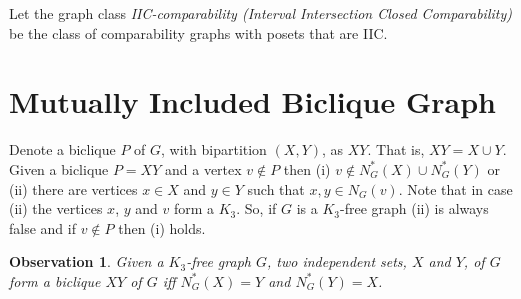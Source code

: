 \documentclass{article}
\newcommand{\margem}[2]
        {\mbox{}\marginpar{%
        \raggedright\textcolor{#2}{%
        \hspace{0pt}\bfseries\ssmall #1\\}}}
\newcommand{\comment}[3]{\margem{\textit{(#1)}\\ #3}{#2}}
\newcommand{\ag}[1]{\comment{AG}{blue}{#1}}
\newcommand{\define}[1]{\emph{#1}}
\newtheorem{observation}{Observation}
\begin{document}
Let  the graph  class  \define{IIC-comparability (Interval  Intersection
  Closed  Comparability)}  be the  class  of  comparability graphs  with
posets that are IIC.


\section{Mutually Included Biclique Graph}

Denote a  biclique $P$ of $G$,  with bipartition $(X,Y)$, as  $XY$. That
is, $XY = X \cup Y$.
%
Given  a  biclique   $P=XY$  and  a  vertex  $v  \not\in   P$  then  (i)
$v \not\in N_G^*(X) \cup N_G^*(Y)$ or  (ii) there are vertices $x \in X$
and $y \in  Y$ such that $x, y  \in N_G(v)$. Note that in  case (ii) the
vertices $x$, $y$ and $v$ form a $K_3$. So, if $G$ is a $K_3$-free graph
(ii) is always false and if $v \not\in P$ then (i) holds.

\begin{observation}\label{obs.Nstar}%
  Given a  $K_3$-free graph $G$, two  independent sets, $X$ and  $Y$, of
  $G$ form  a biclique $XY$  of $G$  iff $N_G^*(X) =  Y$ and
  $N_G^*(Y) = X$.
\end{observation}
\end{document}
